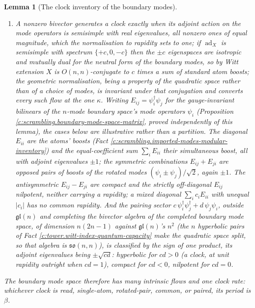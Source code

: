 \documentclass[11pt]{article}
\newtheorem{lemma}[theorem]{Lemma}
\theoremstyle{definition}
\theoremstyle{plain}
\begin{document}
\begin{lemma}[The clock inventory of the boundary modes]
\begin{enumerate}
\item A nonzero bivector generates a clock exactly when its adjoint action on the mode operators is semisimple with real eigenvalues, all nonzero ones of equal magnitude, which the normalisation to rapidity sets to one; if $\operatorname{ad}_X$ is semisimple with spectrum $\{+c, 0, -c\}$ then the $\pm c$ eigenspaces are isotropic and mutually dual for the neutral form of the boundary modes, so by Witt extension $X$ is $O(n,n)$-conjugate to $c$ times a sum of standard atom boosts; the geometric normalisation, being a property of the quadratic space rather than of a choice of modes, is invariant under that conjugation and converts every such flow at the one $\kappa$. Writing $E_{ij} = \psi_i^\dagger\psi_j$ for the gauge-invariant bilinears of the $n$-mode boundary space's mode operators $\psi_i$ (Proposition \ref{c:scrambling.boundary-mode-space-matrix}, proved independently of this lemma), the cases below are illustrative rather than a partition. The diagonal $E_{ii}$ are the atoms' boosts (Fact \ref{c:scrambling.imported-modes-modular-inventory}) and the equal-coefficient sum $\sum_i E_{ii}$ their simultaneous boost, all with adjoint eigenvalues $\pm 1$; the symmetric combinations $E_{ij} + E_{ji}$ are opposed pairs of boosts of the rotated modes $(\psi_i \pm \psi_j)/\sqrt{2}$, again $\pm 1$. The antisymmetric $E_{ij} - E_{ji}$ are compact and the strictly off-diagonal $E_{ij}$ nilpotent, neither carrying a rapidity; a mixed diagonal $\sum_i c_i E_{ii}$ with unequal $|c_i|$ has no common rapidity. And the pairing sector $c\,\psi_i^\dagger\psi_j^\dagger + d\,\psi_j\psi_i$, outside $\mathfrak{gl}(n)$ and completing the bivector algebra of the completed boundary mode space, of dimension $n(2n-1)$ against $\mathfrak{gl}(n)$'s $n^2$ (the $n$ hyperbolic pairs of Fact \ref{c:tower.witt-index-quantum-capacity} make the quadratic space split, so that algebra is $\mathfrak{so}(n,n)$), is classified by the sign of one product, its adjoint eigenvalues being $\pm\sqrt{cd}$: hyperbolic for $cd > 0$ (a clock, at unit rapidity outright when $cd = 1$), compact for $cd < 0$, nilpotent for $cd = 0$.
\end{enumerate}
The boundary mode space therefore has many intrinsic flows and one clock rate: whichever clock is read, single-atom, rotated-pair, common, or paired, its period is $\beta$.
\end{lemma}
\end{document}
